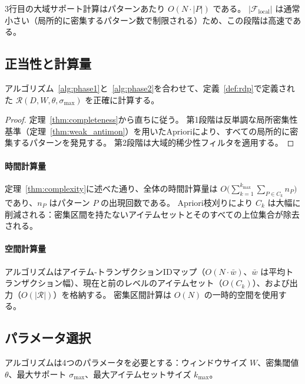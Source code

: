 3行目の大域サポート計算はパターンあたり $O(N \cdot |P|)$ である。
$|\mathcal{F}_{\text{local}}|$ は通常小さい（局所的に密集するパターン数で制限される）ため、この段階は高速である。

\subsection{正当性と計算量}

\begin{corollary}[アルゴリズムの正当性]
アルゴリズム~\ref{alg:phase1}と~\ref{alg:phase2}を合わせて、定義~\ref{def:rdp}で定義された $\mathcal{R}(D, W, \theta, \sigma_{\max})$ を正確に計算する。
\end{corollary}

\begin{proof}
定理~\ref{thm:completeness}から直ちに従う。
第1段階は反単調な局所密集性基準（定理~\ref{thm:weak_antimon}）を用いたAprioriにより、すべての局所的に密集するパターンを発見する。
第2段階は大域的稀少性フィルタを適用する。
\end{proof}

\paragraph{時間計算量}
定理~\ref{thm:complexity}に述べた通り、全体の時間計算量は $O\bigl(\sum_{k=1}^{k_{\max}} \sum_{P \in C_k} n_P\bigr)$ であり、$n_P$ はパターン $P$ の出現回数である。
Apriori枝刈りにより $C_k$ は大幅に削減される：密集区間を持たないアイテムセットとそのすべての上位集合が除去される。

\paragraph{空間計算量}
アルゴリズムはアイテム-トランザクションIDマップ（$O(N \cdot \bar{w})$、$\bar{w}$ は平均トランザクション幅）、現在と前のレベルのアイテムセット（$O(C_k)$）、および出力（$O(|\mathcal{R}|)$）を格納する。
密集区間計算は $O(N)$ の一時的空間を使用する。

\subsection{パラメータ選択}

アルゴリズムは4つのパラメータを必要とする：ウィンドウサイズ $W$、密集閾値 $\theta$、最大サポート $\sigma_{\max}$、最大アイテムセットサイズ $k_{\max}$。

